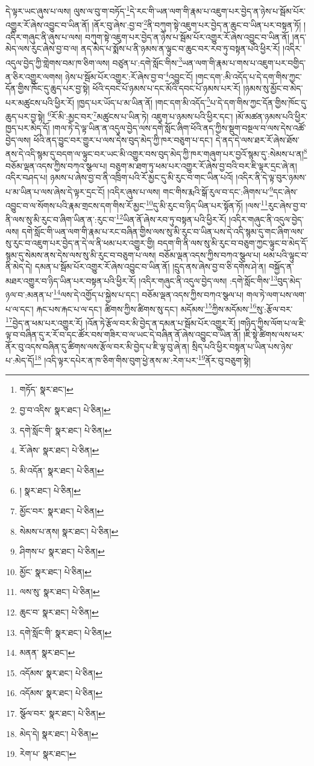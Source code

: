 དེ་ལྟར་ཡང་ཞུས་པ་ལས། ལུས་ལ་བུ་ག་བཏོད་\footnote{གཏོད་  སྣར་ཐང་། }དེ་རང་གི་ཡན་ལག་གི་རྣམ་པ་འཇུག་པར་བྱེད་ན་ཉེས་པ་སྦོམ་པོར་འགྱུར་རོ་ཞེས་འབྱུང་བ་ཡིན་ནོ། །ནོར་བུ་ཞེས་:བྱ་བ་\footnote{བྱ་བ་འདིས་  སྣར་ཐང་།  པེ་ཅིན། }ནི་བཀུག་སྟེ་འཇུག་པར་བྱེད་ན་ཆུང་བ་ཡིན་པར་བསྟན་ཏོ། །འདིར་གཞུང་ནི་ཞུས་པ་ལས། བཀུག་སྟེ་འཇུག་པར་བྱེད་ན་ཉེས་པ་སྦོམ་པོར་འགྱུར་རོ་ཞེས་འབྱུང་བ་ཡིན་ནོ། །ནད་མེད་ལས་རུང་ཞེས་བྱ་བ་ལ། ནད་མེད་པ་སྨོས་པ་ནི་ཉམས་ན་ལྟུང་བ་ཆུང་བར་རབ་ཏུ་བསྟན་པའི་ཕྱིར་རོ། །འདིར་འདུལ་བྱེད་ཀྱི་གླེགས་བམ་ཁ་ཅིག་ལས། བཙུན་པ་:དགེ་སློང་གིས་\footnote{དགེ་སློང་གི་  སྣར་ཐང་།  པེ་ཅིན། }ཡན་ལག་གི་རྣམ་པ་གས་པ་འཇུག་པར་བགྱིད་ན་ཅིར་འགྱུར་ལགས། ཉེས་པ་སྦོམ་པོར་འགྱུར་:རོ་ཞེས་བྱ་བ་\footnote{རོ་ཞེས་  སྣར་ཐང་།  པེ་ཅིན། }འབྱུང་ངོ། །གང་དག་:མི་འདོད་པ་དེ་དག་གིས་ཀྱང་དོན་གྱིས་ཁོང་དུ་ཆུད་པར་བྱ་སྟེ། ཕོའི་དབང་པོ་ཉམས་པ་དང་མོའི་དབང་པོ་ཉམས་པར་རོ། །ཉམས་སུ་མྱོང་བ་མེད་པར་མཚུངས་པའི་ཕྱིར་རོ། །ཁྱད་པར་ཡོད་པ་མ་ཡིན་ནོ། །གང་དག་མི་འདོད་\footnote{མི་འདོན་  སྣར་ཐང་།  པེ་ཅིན། }པ་དེ་དག་གིས་ཀྱང་དོན་གྱིས་ཁོང་དུ་ཆུད་པར་བྱ་སྟེ། \footnote{།    སྣར་ཐང་།  པེ་ཅིན། }རོ་མི་:མྱང་བར་\footnote{མྱོང་བར་  སྣར་ཐང་།  པེ་ཅིན། }མཚུངས་པ་ཡིན་ཏེ། འཇུག་པ་ཉམས་པའི་ཕྱིར་དང་། །མོ་མཚན་ཉམས་པའི་ཕྱིར་ཁྱད་པར་མེད་དོ། །གལ་ཏེ་དེ་ལྟ་ཡིན་ན་འདུལ་བྱེད་ལས་དགེ་སློང་ཞིག་ཕོའི་ནད་ཀྱིས་སྡུག་བསྔལ་བ་ལས་དེས་འཚོ་བྱེད་ལས། ཕོའི་ནད་བྱུང་བར་གྱུར་པ་ལས་དེས་བུད་མེད་ཀྱི་ཁར་བཅུག་པ་དང་། དེ་ནད་དེ་ལས་ཐར་རོ་ཞེས་ཐོས་ནས་དེ་འདི་སྙམ་དུ་བདག་ལ་ལྟུང་བར་ཡང་མི་འགྱུར་བས་བུད་མེད་ཀྱི་ཁར་གཞུག་པར་བྱའོ་སྙམ་དུ་:སེམས་པ་ན།\footnote{སེམས་པ་ནས།  སྣར་ཐང་།  པེ་ཅིན། } བཅོམ་ལྡན་འདས་ཀྱིས་བཀའ་སྩལ་པ། བཅུག་མ་ཐག་ཏུ་ཕམ་པར་འགྱུར་རོ་ཞེས་བྱ་བའི་བར་ཇི་ལྟར་དྲང་ཞེ་ན། འདིར་བཤད་པ། ཉམས་པ་ཞེས་བྱ་བ་ནི་འཁྲིག་པའི་རོ་མྱང་དུ་མི་རུང་བ་གང་ཡིན་པའོ། །འདིར་ནི་དེ་ལྟ་བུར་ཉམས་པ་མ་ཡིན་པ་ལས་ཞེས་དེ་ལྟར་དྲང་ངོ། །འདིར་ཞུས་པ་ལས། གང་གིས་རྨའི་སྒོ་རུལ་བ་དང་:ཞིགས་པ་\footnote{ཤིགས་པ་  སྣར་ཐང་།  པེ་ཅིན། }དང་ཞེས་འབྱུང་བ་ལ་སོགས་པའི་རྣམ་གྲངས་དག་གིས་རོ་མྱང་\footnote{མྱོང་  སྣར་ཐང་།  པེ་ཅིན། }དུ་མི་རུང་བ་ཉིད་ཡིན་པར་སྟོན་ཏོ། །ལས་\footnote{ལས་སུ་  སྣར་ཐང་།  པེ་ཅིན། }རུང་ཞེས་བྱ་བ་ནི་ལས་སུ་མི་རུང་བ་ཞིག་ཡིན་ན་:རུང་བ་\footnote{ཆུང་བ་  སྣར་ཐང་།  པེ་ཅིན། }ཡིན་ནོ་ཞེས་རབ་ཏུ་བསྟན་པའི་ཕྱིར་རོ། །འདིར་གཞུང་ནི་འདུལ་བྱེད་ལས། དགེ་སློང་གི་ཡན་ལག་གི་རྣམ་པ་རང་བཞིན་གྱིས་ལས་སུ་མི་རུང་བ་ཡིན་པས་དེ་འདི་སྙམ་དུ་གང་ཞིག་ལས་སུ་རུང་བ་འཇུག་པར་བྱེད་ན་དེ་ལ་ནི་ཕམ་པར་འགྱུར་གྱི། བདག་གི་ནི་ལས་སུ་མི་རུང་བ་བཅུག་ཀྱང་ལྟུང་བ་མེད་དོ་སྙམ་དུ་སེམས་ནས་དེས་ལས་སུ་མི་རུང་བ་བཅུག་པ་ལས། བཅོམ་ལྡན་འདས་ཀྱིས་བཀའ་སྩལ་པ། ཕམ་པའི་ལྟུང་བ་ནི་མེད་དེ། དམན་པ་སྦོམ་པོར་འགྱུར་རོ་ཞེས་འབྱུང་བ་ཡིན་ནོ། །དྲུད་ནས་ཞེས་བྱ་བ་ཅི་དགོས་ཤེ་ན། བསྐྱོད་ན་མཐར་འགྱུར་བ་ཉིད་ཡིན་པར་བསྟན་པའི་ཕྱིར་རོ། །འདིར་གཞུང་ནི་འདུལ་བྱེད་ལས། :དགེ་སློང་གིས་\footnote{དགེ་སློང་གི་  སྣར་ཐང་།  པེ་ཅིན། }བུད་མེད་ཉལ་བ་:མནན་པ་\footnote{མནན་  སྣར་ཐང་། }ལས་དེ་འགྱོད་པ་སྐྱེས་པ་དང་། བཅོམ་ལྡན་འདས་ཀྱིས་བཀའ་སྩལ་པ། གལ་ཏེ་ལག་པས་ལག་པ་ལ་དང་། རྐང་པས་རྐང་པ་ལ་དང་། ཚིགས་ཀྱིས་ཚིགས་སུ་དང་། མདོམས་\footnote{འདོམས་  སྣར་ཐང་།  པེ་ཅིན། }ཀྱིས་མདོམས་\footnote{འདོམས་  སྣར་ཐང་།  པེ་ཅིན། }སུ་:རྩོལ་བར་\footnote{སྩོལ་བར་  སྣར་ཐང་།  པེ་ཅིན། }བྱེད་ན་ཕམ་པར་འགྱུར་རོ། །འོན་ཏེ་རྩོལ་བར་མི་བྱེད་ན་དམན་པ་སྦོམ་པོར་འགྱུར་རོ། །གཉིད་ཀྱིས་ལོག་པ་ལ་ཇི་ལྟ་བ་བཞིན་དུ་ར་རོ་བ་དང་ཚོར་བས་གཟིར་བ་ལ་ཡང་དེ་བཞིན་ནོ་ཞེས་འབྱུང་བ་ཡིན་ནོ། །ཇི་སྟེ་ཚིགས་ལས་ཕར་ནོར་བུ་འདས་བཞིན་དུ་ཚིགས་ལས་རྩོལ་བར་མི་བྱེད་པ་ཇི་ལྟ་བུ་ཞེ་ན། སྲིད་པའི་ཕྱིར་བསྟན་པ་ཡིན་པས་ཉེས་པ་:མེད་དོ།\footnote{མེད་དེ།  སྣར་ཐང་།  པེ་ཅིན། } །འདི་ལྟར་དཔེར་ན་ཁ་ཅིག་གིས་བུག་ཕྱེ་ནས་མ་:རེག་པར་\footnote{རེག་པ་  སྣར་ཐང་། }ནོར་བུ་བཅུག་སྟེ། 